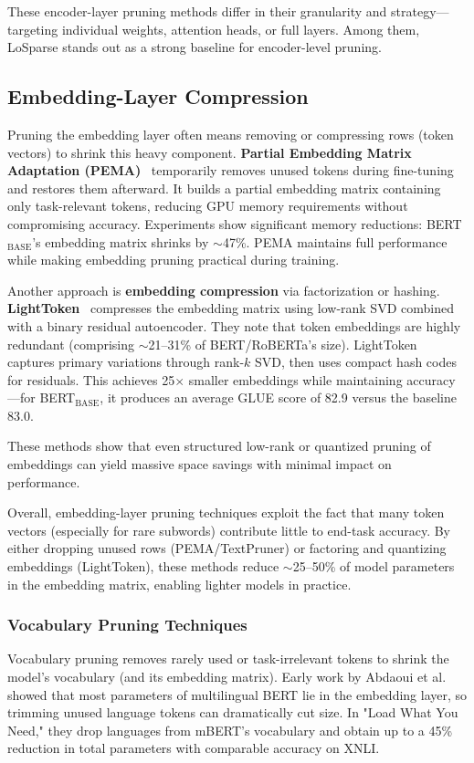 \documentclass[twocolumn]{article}
\begin{document}
These encoder-layer pruning methods differ in their granularity and strategy—targeting individual weights, attention heads, or full layers. Among them, LoSparse stands out as a strong baseline for encoder-level pruning.


\subsection{Embedding-Layer Compression}
Pruning the embedding layer often means removing or compressing rows (token vectors) to shrink this heavy component. \textbf{Partial Embedding Matrix Adaptation (PEMA)}~\cite{bousquet2023pema} temporarily removes unused tokens during fine-tuning and restores them afterward. It builds a partial embedding matrix containing only task-relevant tokens, reducing GPU memory requirements without compromising accuracy. 
Experiments show significant memory reductions: BERT$_{\text{BASE}}$'s embedding matrix shrinks by $\sim$47\%.
PEMA maintains full performance while making embedding pruning practical during training.

Another approach is \textbf{embedding compression} via factorization or hashing. \textbf{LightToken}~\cite{wang2023lighttoken} compresses the embedding matrix using low-rank SVD combined with a binary residual autoencoder. 
They note that token embeddings are highly redundant (comprising $\sim$21--31\% of BERT/RoBERTa's size). LightToken captures primary variations through rank-$k$ SVD, then uses compact hash codes for residuals. This achieves 25$\times$ smaller embeddings while maintaining accuracy—for BERT$_{\text{BASE}}$, it produces an average GLUE score of 82.9 versus the baseline 83.0.

These methods show that even structured low-rank or quantized pruning of embeddings can yield massive space savings with minimal impact on performance.

Overall, embedding-layer pruning techniques exploit the fact that many token vectors (especially for rare subwords) contribute little to end-task accuracy. By either dropping unused rows (PEMA/TextPruner) or factoring and quantizing embeddings (LightToken), these methods reduce $\sim$25--50\% of model parameters in the embedding matrix, enabling lighter models in practice.

\subsubsection{Vocabulary Pruning Techniques}
Vocabulary pruning removes rarely used or task-irrelevant tokens to shrink the model's vocabulary (and its embedding matrix). Early work by Abdaoui et al.~\cite{abdaoui2020load} showed that most parameters of multilingual BERT lie in the embedding layer, so trimming unused language tokens can dramatically cut size. In "Load What You Need," they drop languages from mBERT's vocabulary and obtain up to a 45\% reduction in total parameters with comparable accuracy on XNLI.
\end{document}
